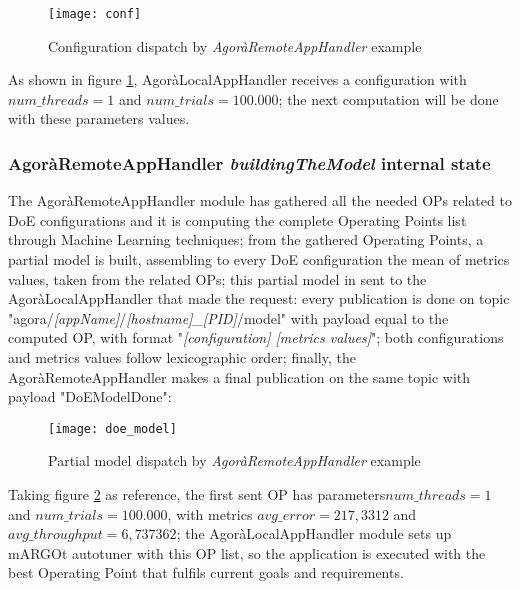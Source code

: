 \begin{figure}[H]

    \centering
    \texttt{[image: conf]}
    \caption{Configuration dispatch by \textit{AgoràRemoteAppHandler} example}
    \label{fig:conf}
    
\end{figure}

As shown in figure \ref{fig:conf}, AgoràLocalAppHandler receives a configuration with $num\_threads = 1$ and $num\_trials = 100.000$; the next computation will be done with these parameters values.


\subsubsection{AgoràRemoteAppHandler \textit{buildingTheModel} internal state}\label{DoEModelSend}

The AgoràRemoteAppHandler module has gathered all the needed OPs related to DoE configurations and it is computing the complete Operating Points list through Machine Learning techniques; from the gathered Operating Points, a partial model is built, assembling to every DoE configuration the mean of metrics values, taken from the related OPs; this partial model in sent to the AgoràLocalAppHandler that made the request: every publication is done on topic "agora/\textit{[appName]}/\textit{[hostname]\_[PID]}/model" with payload equal to the computed OP, with format "\textit{[configuration] [metrics values]}"; both configurations and metrics values follow lexicographic order; finally, the AgoràRemoteAppHandler makes a final publication on the same topic with payload "DoEModelDone":

\begin{figure}[H]

    \centering
    \texttt{[image: doe\_model]}
    \caption{Partial model dispatch by \textit{AgoràRemoteAppHandler} example}
    \label{fig:doe_model}
    
\end{figure}

Taking figure \ref{fig:doe_model} as reference, the first sent OP has parameters\linebreak $num\_threads = 1$ and $num\_trials = 100.000$, with metrics $avg\_error = 217,3312$ and $avg\_throughput = 6,737362$; the AgoràLocalAppHandler module sets up mARGOt autotuner with this OP list, so the application is executed with the best Operating Point that fulfils current goals and requirements.

